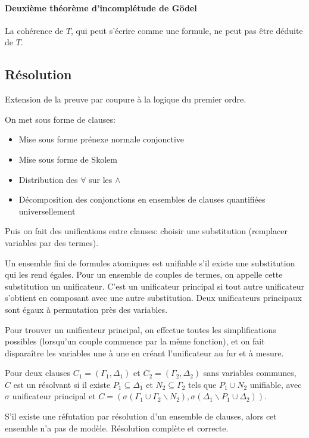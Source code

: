 \documentclass[french]{article}
\begin{document}
\paragraph{Deuxième théorème d'incomplétude de Gödel}
La cohérence de $T$, qui peut s'écrire comme une formule, ne peut pas être déduite de $T$.

\subsection{Résolution}
Extension de la preuve par coupure à la logique du premier ordre.

On met sous forme de clauses:
\begin{itemize}
\item Mise sous forme prénexe normale conjonctive
\item Mise sous forme de Skolem
\item Distribution des $\forall$ sur les $\wedge$
\item Décomposition des conjonctions en ensembles de clauses quantifiées universellement
\end{itemize}

Puis on fait des unifications entre clauses:
choisir une substitution (remplacer variables par des termes).

Un ensemble fini de formules atomiques est unifiable s'il existe une substitution qui les rend égales. Pour un ensemble de couples de termes, on appelle cette substitution un unificateur. C'est un unificateur principal si tout autre unificateur s'obtient en composant avec une autre substitution. Deux unificateurs principaux sont égaux à permutation près des variables.

Pour trouver un unificateur principal, on effectue toutes les simplifications possibles (lorsqu'un couple commence par la même fonction), et on fait disparaître les variables une à une en créant l'unificateur au fur et à mesure.

Pour deux clauses $C_1 = (\Gamma_1, \Delta_1)$ et  $C_2 = (\Gamma_2, \Delta_2)$ sans variables communes, $C$ est un résolvant si il existe $P_1\subseteq\Delta_1$ et $N_2\subseteq\Gamma_2$ tels que $P_1\cup N_2$ unifiable, avec $\sigma$ unificateur principal et $C = (\sigma(\Gamma_1\cup\Gamma_2\backslash N_2), \sigma(\Delta_1\backslash P_1\cup\Delta_2))$.

S'il existe une réfutation par résolution d'un ensemble de clauses, alors cet ensemble n'a pas de modèle. Résolution complète et correcte.
\end{document}
